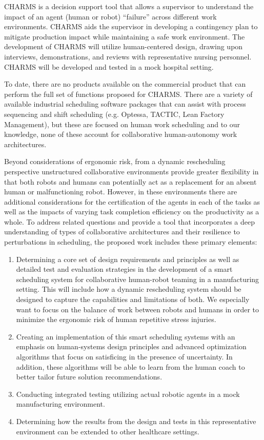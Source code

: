 CHARMS is a decision support tool that allows a supervisor to understand the impact of an agent (human or robot) ``failure'' across different work environments. CHARMS aids the supervisor in developing a contingency plan to mitigate production impact while maintaining a safe work environment. The development of CHARMS will utilize human-centered design, drawing upon interviews, demonstrations, and reviews with representative nursing personnel. CHARMS will be developed and tested in a mock hospital setting.

To date, there are no products available on the commercial product that can perform the full set of functions proposed for CHARMS. There are a variety of available industrial scheduling software packages that can assist with process sequencing and shift scheduling (e.g. Optessa, TACTIC, Lean Factory Management), but these are focused on human work scheduling and to our knowledge, none of these account for collaborative human-autonomy work architectures. 

Beyond considerations of ergonomic risk, from a dynamic rescheduling perspective unstructured collaborative environments provide greater flexibility in that both robots and humans can potentially act as a replacement for an absent human or malfunctioning robot. However, in these environments there are additional considerations for the certification of the agents in each of the tasks as well as the impacts of varying task completion efficiency on the productivity as a whole. To address related questions and provide a tool that incorporates a deep understanding of types of collaborative architectures and their resilience to perturbations in scheduling, the proposed work includes these primary elements:

\begin{enumerate}
    \item Determining a core set of design requirements and principles as well as detailed test and evaluation strategies in the development of a smart scheduling system for collaborative human-robot teaming in a manufacturing setting. This will include how a dynamic rescheduling system should be designed to capture the capabilities and limitations of both. We especially want to focus on the balance of work between robots and humans in order to minimize the ergonomic risk of human repetitive stress injuries.
    \item Creating an implementation of this smart scheduling systems with an emphasis on human-systems design principles and advanced optimization algorithms that focus on satisficing in the presence of uncertainty. In addition, these algorithms will be able to learn from the human coach to better tailor future solution recommendations.
    \item Conducting integrated testing utilizing actual robotic agents in a mock manufacturing environment.
    \item	Determining how the results from the design and tests in this representative environment can be extended to other healthcare settings. 
\end{enumerate}

